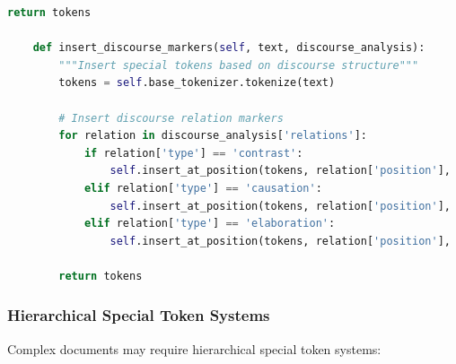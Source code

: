 \begin{lstlisting}[language=Python, caption=Dynamic special token insertion]
        return tokens
    
    def insert_discourse_markers(self, text, discourse_analysis):
        """Insert special tokens based on discourse structure"""
        tokens = self.base_tokenizer.tokenize(text)
        
        # Insert discourse relation markers
        for relation in discourse_analysis['relations']:
            if relation['type'] == 'contrast':
                self.insert_at_position(tokens, relation['position'], '[CONTRAST]')
            elif relation['type'] == 'causation':
                self.insert_at_position(tokens, relation['position'], '[CAUSE]')
            elif relation['type'] == 'elaboration':
                self.insert_at_position(tokens, relation['position'], '[ELAB]')
                
        return tokens
\end{lstlisting}

\subsubsection{Hierarchical Special Token Systems}

Complex documents may require hierarchical special token systems:

